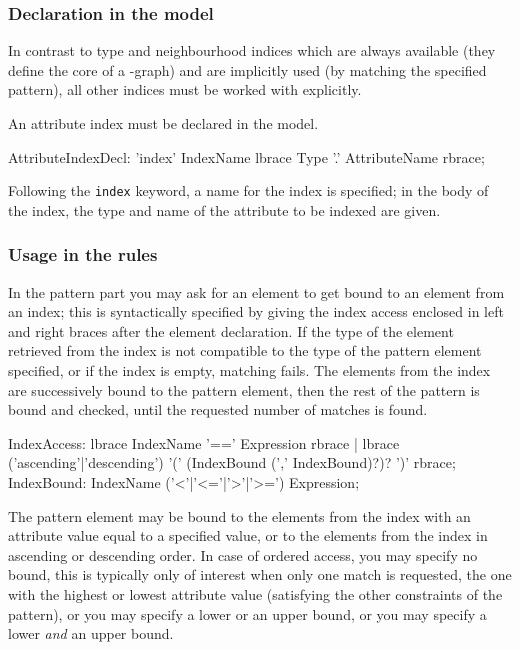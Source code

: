 \subsubsection*{Declaration in the model}
In contrast to type and neighbourhood indices which are always available (they define the core of a \GrG{}-graph) and are implicitly used (by matching the specified pattern), all other indices must be worked with explicitly.

An attribute index must be declared in the model.

\begin{rail}
  AttributeIndexDecl: 'index' IndexName lbrace Type '.' AttributeName rbrace;
\end{rail}

Following the \texttt{index} keyword, a name for the index is specified; in the body of the index, the type and name of the attribute to be indexed are given.

\subsubsection*{Usage in the rules}\label{sub:indexusage}

In the pattern part you may ask for an element to get bound to an element from an index;
this is syntactically specified by giving the index access enclosed in left and right braces after the element declaration.
If the type of the element retrieved from the index is not compatible to the type of the pattern element specified,
or if the index is empty, matching fails.
The elements from the index are successively bound to the pattern element, then the rest of the pattern is bound and checked, until the requested number of matches is found.

\begin{rail}
  IndexAccess:
    lbrace IndexName '==' Expression rbrace |
		lbrace ('ascending'|'descending') '(' (IndexBound (',' IndexBound)?)? ')' rbrace;
	IndexBound: IndexName ('<'|'<='|'>'|'>=') Expression;
\end{rail}

The pattern element may be bound to the elements from the index with an attribute value equal to a specified value,
or to the elements from the index in ascending or descending order.
In case of ordered access, you may specify no bound, this is typically only of interest when only one match is requested, the one with the highest or lowest attribute value (satisfying the other constraints of the pattern), or you may specify a lower or an upper bound, or you may specify a lower \emph{and} an upper bound.

